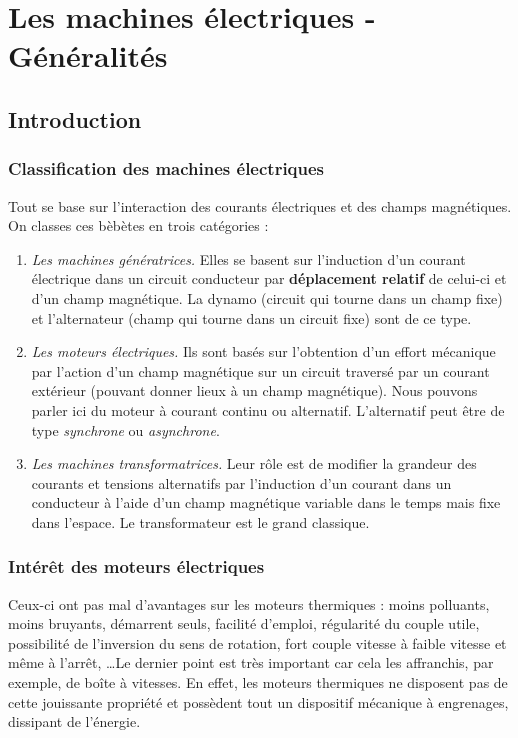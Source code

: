 \chapter{Les machines électriques - Généralités}
\section{Introduction}
	\subsection{Classification des machines électriques}
	Tout se base sur l'interaction des courants électriques et des champs 
	magnétiques. On classes ces bèbètes en trois catégories :
	
	\begin{enumerate}
	\item \textit{Les machines génératrices.} Elles se basent 
	sur l'induction d'un courant électrique dans un circuit conducteur par
	\textbf{déplacement relatif} de celui-ci et d'un champ magnétique. La 
	dynamo (circuit qui tourne dans un champ fixe) et l'alternateur (champ qui tourne dans un circuit fixe) sont de ce type.
	\item \textit{Les moteurs électriques.} Ils sont basés sur 
	l'obtention d'un effort mécanique par l'action d'un champ magnétique sur un circuit traversé par un 
	courant extérieur (pouvant donner lieux à un champ magnétique). Nous 
	pouvons parler ici du moteur à courant continu ou alternatif. L'alternatif peut être de type \textit{synchrone} ou \textit{asynchrone}. 
	\item \textit{Les machines transformatrices.} Leur rôle est 
	de modifier la grandeur des courants et tensions alternatifs par l'induction d'un courant dans un conducteur à l'aide d'un champ magnétique variable dans le temps mais fixe dans l'espace. 
	Le transformateur est le grand classique.
	\end{enumerate}
	
	\subsection{Intérêt des moteurs électriques}
	Ceux-ci ont pas mal d'avantages sur les moteurs thermiques : moins 
	polluants, moins bruyants, démarrent seuls, facilité d'emploi, régularité 
	du couple utile, possibilité de l'inversion du sens de rotation, 
	fort couple vitesse à faible vitesse et même à l'arrêt, \dots Le 
	dernier point est très important car cela les affranchis, par 
	exemple, de boîte à vitesses. En effet, les moteurs thermiques ne 
	disposent pas de cette jouissante propriété et possèdent tout un 
	dispositif mécanique à engrenages, dissipant de l'énergie.
	
